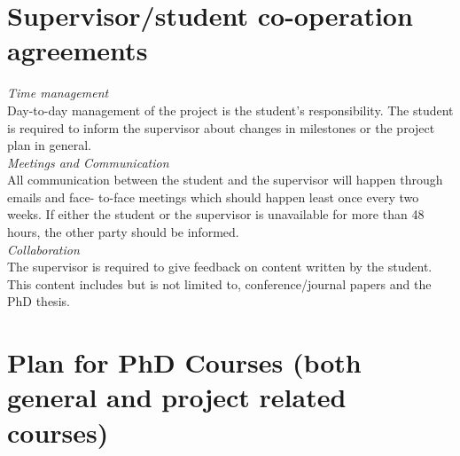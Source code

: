 \section{Supervisor/student co-operation agreements}
\textit{Time management}
\vspace{0.15cm}
\\
\noindent Day-to-day management of the project is the student’s responsibility. The student is required to inform the supervisor about changes in milestones or the project plan in general.
\\

\noindent\textit{Meetings and Communication}
\vspace{0.15cm}
\\
\noindent All communication between the student and the supervisor will happen through emails and face- to-face meetings which should happen least once every two weeks. If either the student or the supervisor is unavailable for more than 48 hours, the other party should be informed.
\\

\noindent\textit{Collaboration}
\vspace{0.15cm}
\\
\noindent The supervisor is required to give feedback on content written by the student. This content includes but is not limited to, conference/journal papers and the PhD thesis.

\section{Plan for PhD Courses (both general and project related courses)}

